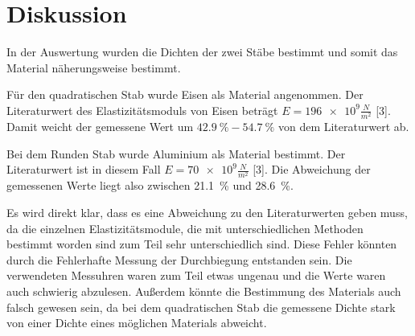 \section{Diskussion}

In der Auswertung wurden die Dichten der zwei Stäbe bestimmt und somit das Material
näherungsweise bestimmt.

Für den quadratischen Stab wurde Eisen als Material angenommen. Der Literaturwert
des Elastizitätsmoduls von Eisen beträgt $E = \num{196e9} \frac{N}{m^2}$ [3]. Damit weicht der
gemessene Wert um $\SI{42.9}{\percent} - \SI{54.7}{\percent} $ von dem Literaturwert ab.

Bei dem Runden Stab wurde Aluminium als Material bestimmt. Der Literaturwert ist in diesem
Fall $E = \num{70e9} \frac{N}{m^2}$ [3]. Die Abweichung der gemessenen Werte liegt also zwischen
\SI{21.1}{\percent} und \SI{28.6}{\percent}.

Es wird direkt klar, dass es eine Abweichung zu den Literaturwerten geben muss, da
die einzelnen Elastizitätsmodule, die mit unterschiedlichen Methoden bestimmt worden
sind zum Teil sehr unterschiedlich sind.
Diese Fehler könnten durch die Fehlerhafte Messung der Durchbiegung entstanden sein.
Die verwendeten Messuhren waren zum Teil etwas ungenau und die Werte waren auch
schwierig abzulesen.
Außerdem könnte die Bestimmung des Materials auch falsch gewesen sein, da bei dem
quadratischen Stab die gemessene Dichte stark von einer Dichte eines möglichen Materials
abweicht.
